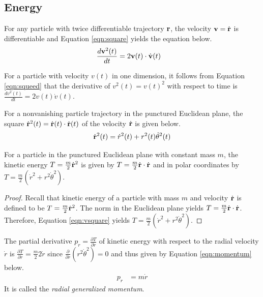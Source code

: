 \subsection{Energy}

For any particle with twice differentiable trajectory $\mathbf{r}$, the velocity $\mathbf{v} = \dot{\mathbf{r}}$ is differentiable and Equation \eqref{eqn:square} yields the equation below.
\begin{align}\label{eqn:squeed}
	\frac{d \mathbf{v}^2(t)}{dt} & = 2 \mathbf{v}(t) \cdot \dot{\mathbf{v}}(t)
\end{align}

\begin{answer}
	For a particle with velocity $v(t)$ in one dimension, it follows from Equation \eqref{eqn:squeed} that the derivative of $v^2(t) = v(t)^2$ with respect to time is $\frac{d v^2(t)}{dt} = 2 v(t) \dot{v}(t)$.
\end{answer}

For a nonvanishing particle trajectory in the punctured Euclidean plane, the square $\dot{\mathbf{r}}^2(t) = \dot{\mathbf{r}}(t) \cdot \dot{\mathbf{r}}(t)$ of the velocity $\dot{\mathbf{r}}$ is given below.
\begin{align}\label{eqn:vsquare}
	\dot{\mathbf{r}}^2(t) = \dot{r}^2(t) + r^2(t) \dot{\theta}^2(t)
\end{align}

\begin{proposition}\label{prop:kinetic}
	For a particle in the punctured Euclidean plane with constant mass $m$, the kinetic energy $T = \frac{m}{2} \dot{\mathbf{r}}^2$ is given by $T = \frac{m}{2} \dot{\mathbf{r}} \cdot \dot{\mathbf{r}}$ and in polar coordinates by $T = \frac{m}{2} \left(\dot{r}^2 + r^2 \dot{\theta}^2\right)$.
\end{proposition}
\begin{proof}
	Recall that kinetic energy of a particle with mass $m$ and velocity $\dot{\mathbf{r}}$ is defined to be $T = \frac{m}{2} \dot{\mathbf{r}}^2$.
	The norm in the Euclidean plane yields $T = \frac{m}{2} \dot{\mathbf{r}} \cdot \dot{\mathbf{r}}$.
	Therefore, Equation \eqref{eqn:vsquare} yields $T = \frac{m}{2} \left(\dot{r}^2 + r^2 \dot{\theta}^2\right)$.
\end{proof}

The partial derivative $p_r = \frac{\partial T}{\partial \dot{r}}$ of kinetic energy with respect to the radial velocity $\dot{r}$ is $\frac{\partial T}{\partial \dot{r}} = \frac{m}{2} 2 \dot{r}$ since $\frac{\partial}{\partial \dot{r}} \left(r^2 \dot{\theta}^2\right) = 0$ and thus given by Equation \eqref{eqn:momentum} below.
\begin{align}\label{eqn:momentum}
	p_r & = m \dot{r}
\end{align}
It is called the \emph{radial generalized momentum}.

